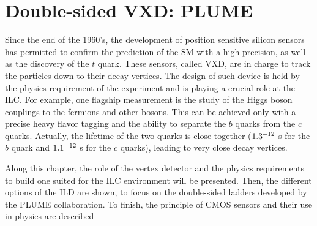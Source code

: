 \chapter{Double-sided VXD: PLUME}
\label{chap:vxd}
  
  Since the end of the 1960's, the development of position sensitive silicon sensors has permitted to confirm the prediction of the \acrfull{SM} with a high precision, as well as the discovery of the $t$ quark.
  These sensors, called \acrfull{VXD}, are in charge to track the particles down to their decay vertices.
  The design of such device is held by the physics requirement of the experiment and is playing a crucial role at the \acrfull{ILC}.
  For example, one flagship measurement is the study of the Higgs boson couplings to the fermions and other bosons.
  This can be achieved only with a precise heavy flavor tagging and the ability to separate the $b$ quarks from the $c$ quarks. 
  Actually, the lifetime of the two quarks is close together ($1.3 \time 10^{-12}$ s for the $b$ quark and $1.1 \time 10^{-12}$ s for the $c$ quarks), leading to  very close decay vertices. 
  
  Along this chapter, the role of the vertex detector and the physics requirements to build one suited for the \gls{ILC} environment will be presented.
  Then, the different options of the \acrfull{ILD} are shown, to focus on the double-sided ladders developed by the \gls{PLUME} collaboration.
  To finish, the principle of \gls{CMOS} sensors and their use in physics are described



